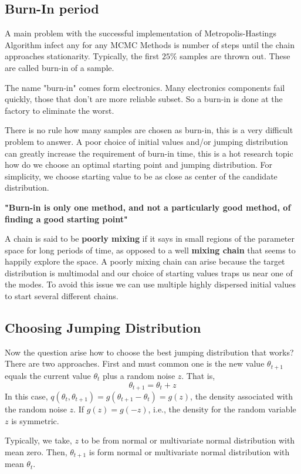 \subsection{Burn-In period}
A main problem with the successful implementation of Metropolis-Hastings Algorithm infect any for any MCMC Methods is number of steps until the chain approaches stationarity.
Typically, the first $ 25\% $ samples are thrown out. These are called burn-in of a sample.

The name "burn-in" comes form electronics. Many electronics components fail quickly, those that don't are more reliable subset. So a burn-in is done at the factory to eliminate the worst.

There is no rule how many samples are chosen as burn-in, this is a very difficult problem to answer. A poor choice of initial values and/or jumping distribution can greatly increase the requirement of burn-in time, this is a hot research topic how do we choose an optimal starting point and jumping distribution. For simplicity, we choose starting value to be as close as center of the candidate distribution.

\textbf{"Burn-in is only one method, and not a particularly good method, of finding a good starting point"}

A chain is said to be \textbf{poorly mixing} if it says in small regions of the parameter
space for long periods of time, as opposed to a well \textbf{mixing chain} that seems to
happily explore the space. A poorly mixing chain can arise because the target
distribution is multimodal and our choice of starting values traps us near one of the modes.
To avoid this issue we can use multiple highly dispersed initial values to start several different chains.

\subsection{Choosing Jumping Distribution}
Now the question arise how to choose the best jumping distribution that works?
There are two approaches. First and must common one is the new value $ \theta_{t+1} $ equals the current value $ \theta_t $ plus a random noise $ z $. That is,
\[
	\theta_{t+1} = \theta_t + z
\]
In this case, $ q(\theta_{t},\theta_{t+1}) = g(\theta_{t+1}-\theta_t) = g(z) $, the density associated with the random noise $ z $. If $ g(z) = g(-z) $, i.e., the density for the random variable $ z $ is symmetric.

Typically, we take, $ z $ to be from normal or multivariate normal distribution with mean zero. Then, $ \theta_{t+1} $ is form normal or multivariate normal distribution with mean $ \theta_t $.

